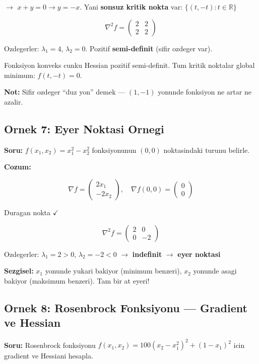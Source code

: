\documentclass[12pt,a4paper]{article}
\theoremstyle{definition}
\theoremstyle{remark}
\begin{document}
$\rightarrow$ $x + y = 0 \rightarrow y = -x$. Yani \textbf{sonsuz kritik nokta} var: $\{(t, -t) : t \in \mathbb{R}\}$

\[
\nabla^2 f = \begin{pmatrix} 2 & 2 \\ 2 & 2 \end{pmatrix}
\]

Ozdegerler: $\lambda_1 = 4$, $\lambda_2 = 0$. Pozitif \textbf{semi-definit} (sifir ozdeger var).

Fonksiyon konveks cunku Hessian pozitif semi-definit. Tum kritik noktalar global minimum: $f(t,-t) = 0$.

\textbf{Not:} Sifir ozdeger ``duz yon'' demek --- $(1,-1)$ yonunde fonksiyon ne artar ne azalir.

\subsection{Ornek 7: Eyer Noktasi Ornegi}

\textbf{Soru:} $f(x_1, x_2) = x_1^2 - x_2^2$ fonksiyonunun $(0,0)$ noktasindaki turunu belirle.

\bigskip
\textbf{Cozum:}

\[
\nabla f = \begin{pmatrix} 2x_1 \\ -2x_2 \end{pmatrix}, \quad \nabla f(0,0) = \begin{pmatrix} 0 \\ 0 \end{pmatrix}
\]

Duragan nokta $\checkmark$

\[
\nabla^2 f = \begin{pmatrix} 2 & 0 \\ 0 & -2 \end{pmatrix}
\]

Ozdegerler: $\lambda_1 = 2 > 0$, $\lambda_2 = -2 < 0$ $\rightarrow$ \textbf{indefinit} $\rightarrow$ \textbf{eyer noktasi}

\textbf{Sezgisel:} $x_1$ yonunde yukari bakiyor (minimum benzeri), $x_2$ yonunde asagi bakiyor (maksimum benzeri). Tam bir at eyeri!

\subsection{Ornek 8: Rosenbrock Fonksiyonu --- Gradient ve Hessian}

\textbf{Soru:} Rosenbrock fonksiyonu $f(x_1, x_2) = 100(x_2 - x_1^2)^2 + (1 - x_1)^2$ icin gradient ve Hessiani hesapla.
\end{document}
